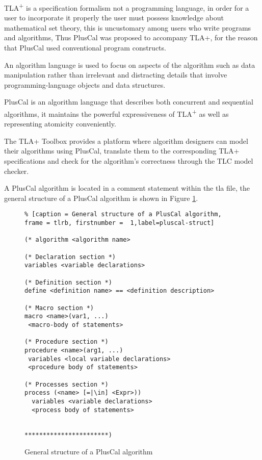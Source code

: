\documentclass{thesul}
\newcommand{\tlaplus}{TLA\textsuperscript{+}\xspace}
\begin{document}
\tlaplus is a specification formalism not a programming language, in order for a user to incorporate it properly the user must possess knowledge about mathematical set theory, this is uncustomary among users who write programs and algorithms, Thus PlusCal was proposed to accompany TLA+, for the reason that PlusCal used conventional program constructs.

An algorithm language is used to focus on aspects of the algorithm such as data manipulation rather than irrelevant and distracting details that involve programming-language objects and data structures.

PlusCal is an algorithm language that describes both concurrent and sequential algorithms, it maintains the powerful expressiveness of \tlaplus as well as representing atomicity conveniently.

The TLA+ Toolbox provides a platform where algorithm designers can model their algorithms using PlusCal, translate them to the corresponding TLA+ specifications and check for the algorithm's correctness through the TLC model checker.

A PlusCal algorithm is located in a comment statement within the tla file, the general structure of a PlusCal algorithm is shown in Figure \ref{pluscal-struct}.

\begin{figure}[!h]
\begin{lstlisting}% [caption = General structure of a PlusCal algorithm, frame = tlrb, firstnumber =  1,label=pluscal-struct]

(* algorithm <algorithm name>

(* Declaration section *)
variables <variable declarations>

(* Definition section *)
define <definition name> == <definition description>

(* Macro section *)
macro <name>(var1, ...)
 <macro-body of statements>

(* Procedure section *)
procedure <name>(arg1, ...)
 variables <local variable declarations>
 <procedure body of statements>

(* Processes section *)
process (<name> [=|\in] <Expr>))
  variables <variable declarations>
  <process body of statements>


***********************)

\end{lstlisting}
\caption{General structure of a PlusCal algorithm}
\label{pluscal-struct}
\end{figure}
\end{document}
